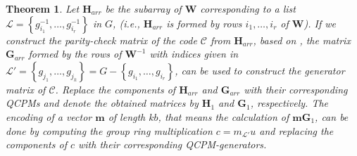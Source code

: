 \documentclass[journal,draftclsnofoot,onecolumn,12pt,twoside]{IEEEtran}
\newtheorem{theorem}{Theorem}
\begin{document}
\begin{theorem}\label{unit_drive}
Let $\mathbf{H}_{arr}$ be the subarray of $\mathbf{W}$ corresponding to a list $\mathcal{L}=\left\lbrace g_{i_1}^{-1},\ldots ,g_{i_r}^{-1}\right\rbrace$ in $G$, (i.e., $\mathbf{H}_{arr}$ is formed by rows $i_1,\ldots,i_r$ of $\mathbf{W}$). If we construct the parity-check matrix of the code $\mathcal{C}$ from $\mathbf{H}_{arr}$, based on \cite[Theorem 5.1]{1}, the matrix $\mathbf{G}_{arr}$  formed by the rows of $\mathbf{W}^{-1}$ with indices given in $\mathcal{L}'=\left\{g_{j_1},\ldots , g_{j_k}\right\} =G-\left\{g_{i_1},\ldots ,g_{i_r}\right\}$, can be used to construct the generator matrix of $\mathcal{C}$. Replace the components of $\mathbf{H}_{arr}$ and $\mathbf{G}_{arr}$ with their corresponding QCPMs and denote the obtained matrices by $\mathbf{H}_1$ and $\mathbf{G}_1$, respectively. The encoding of a vector $\mathbf{m}$ of length $kb$, that means the calculation of $\mathbf{m}\mathbf{G}_1$,   can be done by computing the group ring multiplication $c=m_{\mathcal{L}'}u$ and replacing the components of $c$ with their corresponding QCPM-generators.
\end{theorem}
\end{document}
